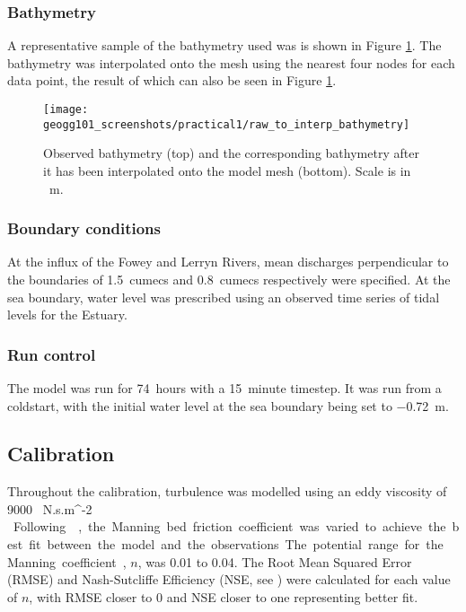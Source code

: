 \documentclass{article}
\begin{document}
\subsubsection{Bathymetry}
A representative sample of the bathymetry used was is shown in Figure \ref{fig:raw_to_interp_bathymetry}. The bathymetry was interpolated onto the mesh using the nearest four nodes for each data point, the result of which can also be seen in Figure \ref{fig:raw_to_interp_bathymetry}.

\begin{figure}[hbp]
    \centering
    \texttt{[image: geogg101\_screenshots/practical1/raw\_to\_interp\_bathymetry]}
    \caption{Observed bathymetry (top) and the corresponding bathymetry after it has been interpolated onto the model mesh (bottom). Scale is in \SI{}{m}.}
    \label{fig:raw_to_interp_bathymetry}
\end{figure}

\subsubsection{Boundary conditions}
At the influx of the Fowey and Lerryn Rivers, mean discharges perpendicular to the boundaries of \SI{1.5}{cumecs} and \SI{0.8}{cumecs} respectively were specified. At the sea boundary, water level was prescribed using an observed time series of tidal levels for the Estuary.

\subsubsection{Run control}
The model was run for \SI{74}{hours} with a \SI{15}{minute} timestep. It was run from a coldstart, with the initial water level at the sea boundary being set to \SI{-0.72}{m}. 

\subsection{Calibration}

Throughout the calibration, turbulence was modelled using an eddy viscosity of \SI{9000}{ N.s.m^{-2} }.
Following \textcite{piedra2007residual, sousa2007hydrodynamic}, the  Manning bed friction coefficient was varied to achieve the best fit between the model and the observations. The potential range for the Manning coefficient, $n$, was 0.01 to 0.04. The Root Mean Squared Error (RMSE) and Nash-Sutcliffe Efficiency (NSE, see \textcite{nash1970river}) were calculated for each value of $n$, with RMSE closer to 0 and NSE closer to one representing better fit.
\end{document}

